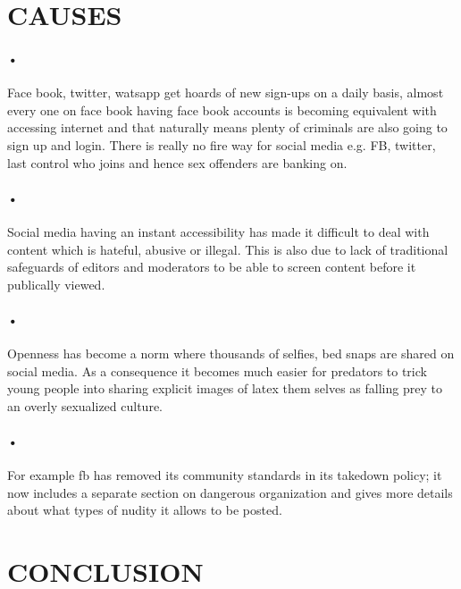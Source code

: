 \documentclass[12pt]{article}
\begin{document}
\section{CAUSES}
\paragraph{•}
Face book, twitter, watsapp get hoards of new sign-ups on a daily basis, almost every one on face book having face book accounts is becoming equivalent with accessing internet and that naturally means plenty of criminals are also going to sign up and login.
There is really no fire way for social media e.g. FB, twitter, last control who joins and hence sex offenders are banking on.
\paragraph{•}
Social media having an instant accessibility has made it difficult to deal with content which is hateful, abusive or illegal. This is also due to lack of traditional safeguards of editors and moderators to be able to screen content before it publically viewed.
\paragraph{•}
Openness has become a norm where thousands of selfies, bed snaps are shared on social media. As  a consequence  it becomes  much easier for predators to trick young people into sharing explicit images of latex  them selves as falling prey to an overly sexualized culture.
\paragraph{•}
For example fb has removed its community standards in its takedown policy; it now includes a separate section on dangerous organization and gives more details about what types of nudity it allows to be posted.

\section{CONCLUSION}
\end{document}
